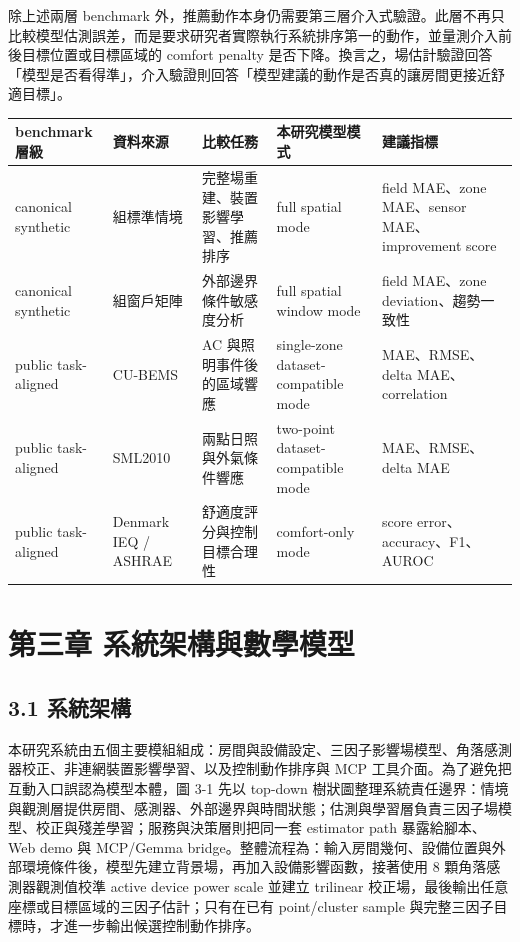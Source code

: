 \documentclass[12pt,a4paper]{article}
\begin{document}
除上述兩層 benchmark 外，推薦動作本身仍需要第三層介入式驗證。此層不再只比較模型估測誤差，而是要求研究者實際執行系統排序第一的動作，並量測介入前後目標位置或目標區域的 comfort penalty 是否下降。換言之，場估計驗證回答「模型是否看得準」，介入驗證則回答「模型建議的動作是否真的讓房間更接近舒適目標」。


\begin{table}[htbp]
\centering
\footnotesize
\renewcommand{\arraystretch}{1.25}
\begin{tabular}{|>{\raggedright\arraybackslash}p{}|>{\raggedright\arraybackslash}p{}|>{\raggedright\arraybackslash}p{}|>{\raggedright\arraybackslash}p{}|>{\raggedright\arraybackslash}p{}|}
\hline
\textbf{benchmark 層級} & \textbf{資料來源} & \textbf{比較任務} & \textbf{本研究模型模式} & \textbf{建議指標} \\
\hline
canonical synthetic & 8 組標準情境 & 完整場重建、裝置影響學習、推薦排序 & full spatial mode & field MAE、zone MAE、sensor MAE、improvement score \\
\hline
canonical synthetic & 48 組窗戶矩陣 & 外部邊界條件敏感度分析 & full spatial window mode & field MAE、zone deviation、趨勢一致性 \\
\hline
public task-aligned & CU-BEMS & AC 與照明事件後的區域響應 & single-zone dataset-compatible mode & MAE、RMSE、delta MAE、correlation \\
\hline
public task-aligned & SML2010 & 兩點日照與外氣條件響應 & two-point dataset-compatible mode & MAE、RMSE、delta MAE \\
\hline
public task-aligned & Denmark IEQ / ASHRAE & 舒適度評分與控制目標合理性 & comfort-only mode & score error、accuracy、F1、AUROC \\
\hline
\end{tabular}
\end{table}

\clearpage

\section*{第三章 系統架構與數學模型}

\subsection*{3.1 系統架構}

本研究系統由五個主要模組組成：房間與設備設定、三因子影響場模型、角落感測器校正、非連網裝置影響學習、以及控制動作排序與 MCP 工具介面。為了避免把互動入口誤認為模型本體，圖 3-1 先以 top-down 樹狀圖整理系統責任邊界：情境與觀測層提供房間、感測器、外部邊界與時間狀態；估測與學習層負責三因子場模型、校正與殘差學習；服務與決策層則把同一套 estimator path 暴露給腳本、Web demo 與 MCP/Gemma bridge。整體流程為：輸入房間幾何、設備位置與外部環境條件後，模型先建立背景場，再加入設備影響函數，接著使用 8 顆角落感測器觀測值校準 active device power scale 並建立 trilinear 校正場，最後輸出任意座標或目標區域的三因子估計；只有在已有 point/cluster sample 與完整三因子目標時，才進一步輸出候選控制動作排序。
\end{document}
